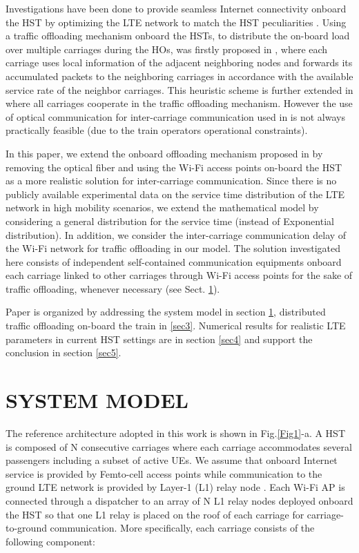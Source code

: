 \documentclass[journal]{IEEEtran}
\begin{document}
{Investigations have been done to provide seamless Internet connectivity onboard the HST by optimizing the LTE network to match the HST peculiarities \cite{Karimi_2012,Sniady_2016}. Using a traffic offloading mechanism onboard the HSTs, to distribute the on-board load over multiple carriages during the HOs, was firstly proposed in \cite{Goratti_2014}, where each carriage uses local information of the adjacent neighboring nodes and forwards its accumulated packets to the neighboring carriages in accordance with the available service rate of the neighbor carriages. This heuristic scheme is further extended in \cite{Parichehreh_2015} where all carriages cooperate in the traffic offloading mechanism. However the use of optical communication for inter-carriage communication used in \cite{Parichehreh_2015} is not always practically feasible (due to the train operators operational constraints).
 
In this paper, we extend the onboard offloading mechanism proposed in \cite{Parichehreh_2015} by removing the optical fiber and using the Wi-Fi access points on-board the HST as a more realistic solution for inter-carriage communication. Since there is no publicly available experimental data on the service time distribution of the LTE network in high mobility scenarios, we extend the mathematical model by considering a general distribution for the service time (instead of Exponential distribution). In addition, we consider the inter-carriage communication delay of the Wi-Fi network for traffic offloading in our model. The solution investigated here consists of independent self-contained communication equipments onboard each carriage linked to other carriages through Wi-Fi access points for the sake of traffic offloading, whenever necessary (see Sect. \ref{sec2}).

Paper is organized by addressing the system model in section \ref{sec2}, distributed traffic offloading on-board the train in \ref{sec3}. Numerical results for realistic LTE parameters in current HST settings are in section \ref{sec4} and support the conclusion in section \ref{sec5}.


\section{SYSTEM MODEL}
\label{sec2}
The reference architecture adopted in this work is shown in Fig.\ref{Fig1}-a. A HST is composed of N consecutive carriages where each carriage accommodates several passengers including a subset of active UEs. We assume that onboard Internet service is provided by Femto-cell access points while communication to the ground LTE network is provided by Layer-1 (L1) relay node \cite{3GPP_2014}. Each Wi-Fi AP is connected through a dispatcher to an array of N L1 relay nodes deployed onboard the HST so that one L1 relay is placed on the roof of each carriage for carriage-to-ground communication. More specifically, each carriage consists of the following component:

}
\end{document}
